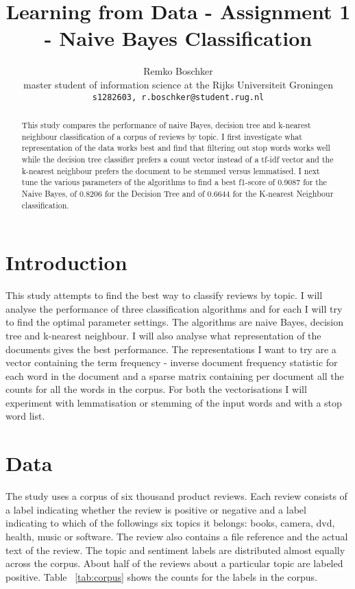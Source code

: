 \documentclass[11pt]{article}
\title{Learning from Data - Assignment 1 - Naive Bayes Classification}
\author{Remko Boschker \\
  master student of information science at the Rijks Universiteit Groningen \\
  {\tt s1282603, r.boschker@student.rug.nl} }
\date{}
\begin{document}
\maketitle
\begin{abstract}
This study compares the performance of naive Bayes, decision tree and k-nearest neighbour classification of a corpus of reviews by topic. I first investigate what representation of the data works best and find that filtering out stop words works well while the decision tree classifier prefers a count vector instead of a tf-idf vector and the k-nearest neighbour prefers the document to be stemmed versus lemmatised. I next tune the various parameters of the algorithms to find a best f1-score of 0.9087 for the Naive Bayes, of 0.8206 for the Decision Tree and of 0.6644 for the K-nearest Neighbour classification.
\end{abstract}

\section{Introduction}

This study attempts to find the best way to classify reviews by topic. I will analyse the performance of three classification algorithms and for each I will try to find the optimal parameter settings. The algorithms are naive Bayes, decision tree and k-nearest neighbour. I will also analyse what representation of the documents gives the best performance. The representations I want to try are a vector containing the term frequency - inverse document frequency statistic for each word in the document and a sparse matrix containing per document all the counts for all the words in the corpus. For both the vectorisations I will experiment with lemmatisation or stemming of the input words and with a stop word list.

\section{Data}

The study uses a corpus of six thousand product reviews. Each review consists of a label indicating whether the review is positive or negative and a label indicating to which of the followings six topics it belongs: books, camera, dvd, health, music or software. The review also contains a file reference and the actual text of the review. The topic and sentiment labels are distributed almost equally across the corpus. About half of the reviews about a particular topic are labeled positive. Table ~\ref{tab:corpus} shows the counts for the labels in the corpus.
\end{document}
